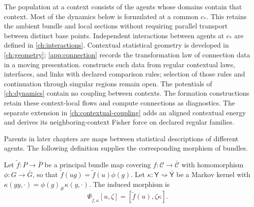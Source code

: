 The population at a context consists of the agents whose domains contain that context. Most of the dynamics below is formulated at a common $c_*$. This retains the ambient bundle and local sections without requiring parallel transport between distinct base points. Independent interactions between agents at $c_*$ are defined in \cref{ch:interactions}. Contextual statistical geometry is developed in \cref{ch:geometry}; \cref{app:connection} records the transformation law of connection data in a moving presentation.  constructs such data from regular contextual laws, interfaces, and links with declared comparison rules; selection of those rules and continuation through singular regions remain open. The potentials of \cref{ch:dynamics} contain no coupling between contexts. The formation constructions retain these context-local flows and compute connections as diagnostics. The separate extension in \cref{ch:contextual-coupling} adds an aligned contextual energy and derives its neighboring-context Fisher force on declared regular families.

Parents in later chapters are maps between statistical descriptions of different agents. The following definition supplies the corresponding morphism of bundles.

Let $\tilde f:P\to\bar P$ be a principal bundle map covering $f:\mathcal C\to\bar{\mathcal C}$ with homomorphism $\phi:G\to\bar G$, so that $\tilde f(ug)=\tilde f(u)\phi(g)$. Let $\kappa:\mathsf Y\rightsquigarrow\bar{\mathsf Y}$ be a Markov kernel with $\kappa(gy,\cdot)=\phi(g)_\#\kappa(y,\cdot)$. The induced morphism is
\begin{equation}
\Psi_{\tilde f,\kappa}[u,\zeta]=[\tilde f(u),\zeta\kappa].
\label{eq:bundle-morphism}
\end{equation}

